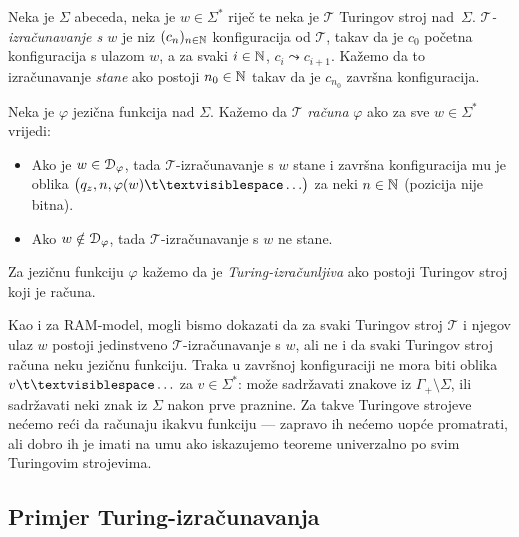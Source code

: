 \begin{definicija}[{name=[Turing-izračunljiva jezična funkcija]}]\label{def:Tcomputefi}
Neka je $\Sigma$ abeceda, neka je $w\in\Sigma^*$ riječ te neka je $\mathcal T$ Turingov stroj nad~$\Sigma$. \emph{$\mathcal T$\!-izračunavanje s $w$} je niz $(c_n)_{n\in{\mathbb N}}$ konfiguracija od $\mathcal T$, takav da je $c_0$ početna konfiguracija s ulazom $w$, a za svaki $i\in{\mathbb N}$, $c_i\leadsto c_{i+1}$. Kažemo da to izračunavanje \emph{stane} ako postoji $n_0\in{\mathbb N}$ takav da je $c_{n_0}$ završna konfiguracija.

Neka je $\varphi$ jezična funkcija nad $\Sigma$. Kažemo da $\mathcal T$ \emph{računa} $\varphi$ ako za sve $w\in\Sigma^*$ vrijedi:
\begin{itemize}
    \item Ako je $w\in\mathcal D_{\varphi}$, tada $\mathcal T$-izračunavanje s $w$ stane i završna konfiguracija mu je oblika $\bigl(q_z,n,\varphi(w)\bl\ldots\bigr)$ za neki $n\in{\mathbb N}$ (pozicija nije bitna).
    \item Ako $w\notin\mathcal D_{\varphi}$, tada $\mathcal T$-izračunavanje s $w$ ne stane.
\end{itemize}
Za jezičnu funkciju $\varphi$ kažemo da je \emph{Turing-izračunljiva} ako postoji Turingov stroj koji je računa.
\end{definicija}

Kao i za RAM-model, mogli bismo dokazati da za svaki Turingov stroj $\mathcal T$ i njegov ulaz $w$ postoji jedinstveno $\mathcal T$-izračunavanje s $w$, ali ne i da svaki Turingov stroj računa neku jezičnu funkciju. Traka u završnoj konfiguraciji ne mora biti oblika $v\bl\ldots$ za $v\in\Sigma^*$: može sadržavati znakove iz $\Gamma_+\!\setminus\Sigma$, ili sadržavati neki znak iz $\Sigma$ nakon prve praznine. Za takve Turingove strojeve nećemo reći da računaju ikakvu funkciju --- zapravo ih nećemo uopće promatrati, ali dobro ih je imati na umu ako iskazujemo teoreme univerzalno po svim Turingovim strojevima.

\subsection{Primjer Turing-izračunavanja}

